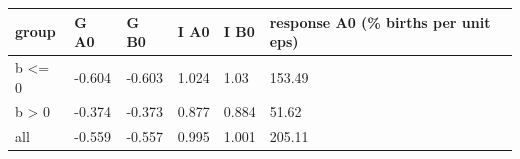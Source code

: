 \begingroup\small
\setlength{\tabcolsep}{3pt}
\renewcommand{\arraystretch}{1.04}
\begin{tabularx}{\linewidth}{XXXXXX}
\toprule
group & G A0 & G B0 & I A0 & I B0 & response A0 (\% births per unit eps) \\
\midrule
b \textless{}= 0 & -0.604 & -0.603 & 1.024 & 1.03 & 153.49 \\
b \textgreater{} 0 & -0.374 & -0.373 & 0.877 & 0.884 & 51.62 \\
all & -0.559 & -0.557 & 0.995 & 1.001 & 205.11 \\
\bottomrule
\end{tabularx}
\endgroup
